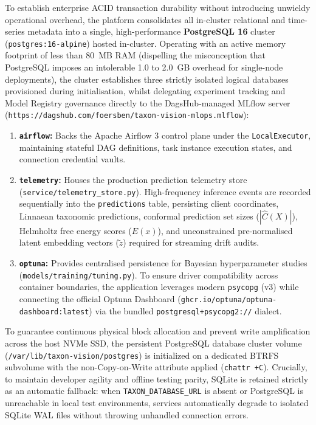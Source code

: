 To establish enterprise ACID transaction durability without introducing unwieldy operational overhead, the platform consolidates all in-cluster relational and time-series metadata into a single, high-performance \textbf{PostgreSQL 16} cluster (\texttt{postgres:16-alpine}) hosted in-cluster. Operating with an active memory footprint of less than 80~MB RAM (dispelling the misconception that PostgreSQL imposes an intolerable 1.0 to 2.0~GB overhead for single-node deployments), the cluster establishes three strictly isolated logical databases provisioned during initialisation, whilst delegating experiment tracking and Model Registry governance directly to the DagsHub-managed MLflow server (\nolinkurl{https://dagshub.com/foersben/taxon-vision-mlops.mlflow}):
\begin{enumerate}
    \item \textbf{\texttt{airflow}:} Backs the Apache Airflow 3 control plane under the \texttt{LocalExecutor}, maintaining stateful DAG definitions, task instance execution states, and connection credential vaults.
    \item \textbf{\texttt{telemetry}:} Houses the production prediction telemetry store (\nolinkurl{service/telemetry_store.py}). High-frequency inference events are recorded sequentially into the \texttt{predictions} table, persisting client coordinates, Linnaean taxonomic predictions, conformal prediction set sizes ($|\hat{C}(X)|$), Helmholtz free energy scores ($E(x)$), and unconstrained pre-normalised latent embedding vectors ($\tilde{z}$) required for streaming drift audits.
    \item \textbf{\texttt{optuna}:} Provides centralised persistence for Bayesian hyperparameter studies (\nolinkurl{models/training/tuning.py}). To ensure driver compatibility across container boundaries, the application leverages modern \texttt{psycopg} (v3) while connecting the official Optuna Dashboard (\texttt{ghcr.io/optuna/optuna-dashboard:latest}) via the bundled \texttt{postgresql+psycopg2://} dialect.
\end{enumerate}

To guarantee continuous physical block allocation and prevent write amplification across the host NVMe SSD, the persistent PostgreSQL database cluster volume (\nolinkurl{/var/lib/taxon-vision/postgres}) is initialized on a dedicated BTRFS subvolume with the non-Copy-on-Write attribute applied (\texttt{chattr +C}). Crucially, to maintain developer agility and offline testing parity, SQLite is retained strictly as an automatic fallback: when \texttt{TAXON\_DATABASE\_URL} is absent or PostgreSQL is unreachable in local test environments, services automatically degrade to isolated SQLite WAL files without throwing unhandled connection errors.
